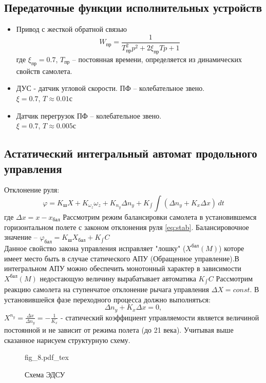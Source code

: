 \documentclass{article}
\begin{document}
\subsection{Передаточные функции исполнительных устройств}
\begin{itemize}
	\item Привод с жесткой обратной связью
	      \[
		      W_\text{пр} = \frac{1}{T_\text{пр}^2p^2 + 2 \xi_\text{пр} Tp + 1}
	      \]
	      где $\xi_\text{пр} = 0.7$, $T_\text{пр}$ -- постоянная времени, определяется из динамических свойств самолета.

	\item ДУС - датчик угловой скорости.
	      ПФ -- колебательное звено.\\
          $\xi = 0.7$, $T \approx 0.01 \text{с}$
	      
	\item Датчик перегрузок
	      ПФ -- колебательное звено.\\
          $\xi = 0.7$, $T \approx 0.005 \text{с}$
\end{itemize}

\subsection{Астатический интегральный автомат продольного управления}
Отклонение руля:
\begin{equation}
    \varphi = K_\text{ш} X + K_{\omega_z} \omega_z + K_{n_y} \Delta n_y + K_{\int} \int (\Delta n_y + K_x \Delta x) \, dt
	\label{eq:stab}
\end{equation}
где $\Delta x = x - x_\text{бал}$
Рассмотрим режим балансировки самолета в установившемся горизонтальном полете с законом отклонения руля \eqref{eq:stab}.
Балансировочное значение -- $\varphi_\text{бал} = K_\text{ш} X_\text{бал} + K_{\int} C$\\
Данное свойство закона управления исправляет "лошку" ($X^\text{бал}(M)$) которе имеет место быть в случае статического АПУ (Обращенное управление).В интегральном АПУ можно обеспечить монотонный характер в зависимости $X^\text{бал} (M)$ недостающую величину вырабатывает автоматика $K_{\int}C$
Рассмотрим реакцию самолета на ступенчатое отклонение рычага управления $\Delta X = const$. В установившейся фазе переходного процесса должно выполняться:
\[
	\Delta n_y + K_x \Delta x = 0, 
\]
$ X^{n_y} = \frac{\Delta x}{\Delta n_y} = -\frac{1}{K_x} $ - статический коэффициент управляемости является величиной постоянной и не зависит от режима полета (до 21 века). 
Учитывая выше сказанное нарисуем структурную схему.
\begin{figure}[H]
	\begin{minipage}{\textwidth}
		\centering
		{fig_8.pdf_tex}
	\end{minipage}
	\caption{Схема ЭДСУ}
\end{figure}
\end{document}

